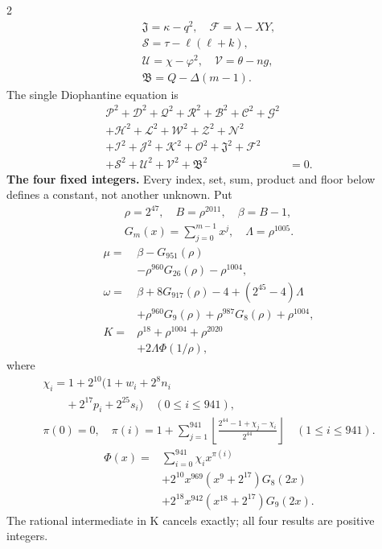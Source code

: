 \documentclass[10pt]{article}
\newcommand{\fl}[1]{\left\lfloor#1\right\rfloor}
\begin{document}
\begin{multicols}{2}
\[\begin{gathered}
\mathfrak{J}=\kappa-q^2,\quad\mathcal{F}=\lambda-XY,\\
\mathcal{S}=\tau-\ell(\ell+k),\\
\mathcal{U}=\chi-\varphi^2,\quad\mathcal{V}=\theta-ng,\\
\mathfrak{B}=Q-\Delta(m-1).
\end{gathered}
\]
The single Diophantine equation is
\[
\begin{split}
\mathcal{P}^2+\mathcal{D}^2+\mathcal{Q}^2+\mathcal{R}^2+\mathcal{B}^2+\mathcal{C}^2+\mathcal{G}^2 &\\
+\mathcal{H}^2+\mathcal{L}^2+\mathcal{W}^2+\mathcal{Z}^2+\mathcal{N}^2 &\\
+\mathcal{I}^2+\mathcal{J}^2+\mathcal{K}^2+\mathcal{O}^2+\mathfrak{J}^2+\mathcal{F}^2 &\\
+\mathcal{S}^2+\mathcal{U}^2+\mathcal{V}^2+\mathfrak{B}^2 &= 0.
\end{split}
\]
\textbf{The four fixed integers.}
Every index, set, sum, product and floor below defines a constant, not
another unknown. Put
\[
\begin{gathered}
\rho=2^{47},\quad B=\rho^{2011},\quad\beta=B-1,\\
G_m(x)=\sum_{j=0}^{m-1}x^j,\quad
\Lambda=\rho^{1005}.
\end{gathered}
\]
\begin{align*}
\mu={}&\beta-G_{951}(\rho)\\
&-\rho^{960}G_{26}(\rho)-\rho^{1004},\\
\omega={}&\beta+8G_{917}(\rho)-4+(2^{45}-4)\Lambda\\
&+\rho^{960}G_9(\rho)+\rho^{987}G_8(\rho)
  +\rho^{1004},\\
K={}&\rho^{18}+\rho^{1004}+\rho^{2020}\\
&+2\Lambda\Phi(1/\rho),
\end{align*}
where
\[
\begin{gathered}
\chi_i=1+2^{10}(1+w_i+2^8n_i\\
\qquad+2^{17}p_i+2^{25}s_i)\quad(0\le i\le941),\\
\pi(0)=0,\quad\pi(i)=1+\sum_{j=1}^{941}
\fl{\frac{2^{44}-1+\chi_j-\chi_i}{2^{44}}}\quad(1\le i\le941).
\end{gathered}
\]
\[
\begin{split}
\Phi(x)={}&\sum_{i=0}^{941}\chi_i x^{\pi(i)}\\
&+2^{10}x^{969}(x^9+2^{17})G_8(2x)\\
&+2^{18}x^{942}(x^{18}+2^{17})G_9(2x).
\end{split}
\]
The rational intermediate in K cancels exactly; all four results are positive integers.


\end{multicols}
\end{document}
